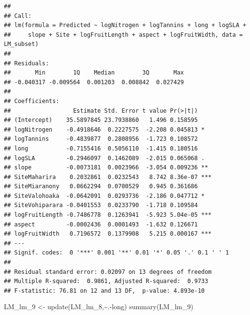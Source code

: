 \documentclass[
  12pt,
]{article}
\newenvironment{Shaded}{\begin{snugshade}}{\end{snugshade}}
\newcommand{\FunctionTok}[1]{\textcolor[rgb]{0.00,0.00,0.00}{#1}}
\newcommand{\NormalTok}[1]{#1}
\newcommand{\OtherTok}[1]{\textcolor[rgb]{0.56,0.35,0.01}{#1}}
\newcommand{\SpecialCharTok}[1]{\textcolor[rgb]{0.00,0.00,0.00}{#1}}
\begin{document}
\begin{verbatim}
## 
## Call:
## lm(formula = Predicted ~ logNitrogen + logTannins + long + logSLA + 
##     slope + Site + logFruitLength + aspect + logFruitWidth, data = LM_subset)
## 
## Residuals:
##       Min        1Q    Median        3Q       Max 
## -0.040317 -0.009564  0.001203  0.008842  0.027429 
## 
## Coefficients:
##                  Estimate Std. Error t value Pr(>|t|)    
## (Intercept)    35.5897845 23.7938860   1.496 0.158595    
## logNitrogen    -0.4918646  0.2227575  -2.208 0.045813 *  
## logTannins     -0.4839877  0.2808956  -1.723 0.108572    
## long           -0.7155416  0.5056110  -1.415 0.180516    
## logSLA         -0.2946097  0.1462089  -2.015 0.065068 .  
## slope          -0.0073181  0.0023966  -3.054 0.009236 ** 
## SiteMaharira    0.2032861  0.0232543   8.742 8.36e-07 ***
## SiteMiaranony   0.0662294  0.0700529   0.945 0.361686    
## SiteValohoaka  -0.0642091  0.0293736  -2.186 0.047712 *  
## SiteVohiparara -0.0401553  0.0233790  -1.718 0.109584    
## logFruitLength -0.7486778  0.1263941  -5.923 5.04e-05 ***
## aspect         -0.0002436  0.0001493  -1.632 0.126671    
## logFruitWidth   0.7196572  0.1379908   5.215 0.000167 ***
## ---
## Signif. codes:  0 '***' 0.001 '**' 0.01 '*' 0.05 '.' 0.1 ' ' 1
## 
## Residual standard error: 0.02097 on 13 degrees of freedom
## Multiple R-squared:  0.9861, Adjusted R-squared:  0.9733 
## F-statistic: 76.81 on 12 and 13 DF,  p-value: 4.893e-10
\end{verbatim}

\begin{Shaded}
\begin{Highlighting}[]
\NormalTok{LM\_lm\_9 }\OtherTok{\textless{}{-}} \FunctionTok{update}\NormalTok{(LM\_lm\_8,}\SpecialCharTok{\textasciitilde{}}\NormalTok{.}\SpecialCharTok{{-}}\NormalTok{long)}
\FunctionTok{summary}\NormalTok{(LM\_lm\_9)}
\end{Highlighting}
\end{Shaded}
\end{document}
